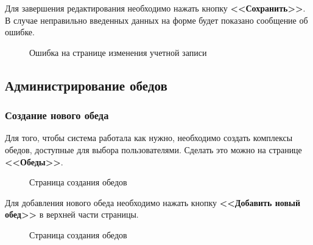 \documentclass[a4paper]{article}
\begin{document}
Для завершения редактирования необходимо нажать кнопку \textbf{<<Сохранить>>}. В случае неправильно введенных данных на форме будет показано сообщение об ошибке.

\begin{figure}[h]
\caption{Ошибка на странице изменения учетной записи}
\label{fig:image13}
\end{figure}

\newpage
\subsection{Администрирование обедов}

\subsubsection{Создание нового обеда}

Для того, чтобы система работала как нужно, необходимо создать комплексы обедов, доступные для выбора пользователями. Сделать это можно на странице \textbf{<<Обеды>>}. 

\begin{figure}[h]
\caption{Страница создания обедов}
\label{fig:image14}
\end{figure}

Для добавления нового обеда необходимо нажать кнопку \textbf{<<Добавить новый обед>>} в верхней части страницы.

\begin{figure}[h]
\caption{Страница создания обедов}
\label{fig:image15}
\end{figure}
\end{document}
